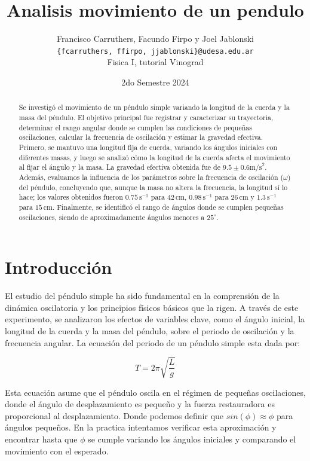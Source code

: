 \documentclass[12pt,a4]{article}
\title{Analisis movimiento de un pendulo}
\author{Francisco Carruthers, Facundo Firpo y Joel Jablonski\\ [2mm]
\small \texttt{\{fcarruthers, ffirpo, jjablonski\}@udesa.edu.ar}\\
\small Fisica I, tutorial Vinograd}
\date{2do Semestre 2024}
\begin{document}
\maketitle

\begin{abstract}
    Se investigó el movimiento de un péndulo simple variando la longitud de la cuerda y la masa del péndulo. El objetivo principal fue registrar y caracterizar su trayectoria, determinar el rango angular donde se cumplen las condiciones de pequeñas oscilaciones, calcular la frecuencia de oscilación y estimar la gravedad efectiva. Primero, se mantuvo una longitud fija de cuerda, variando los ángulos iniciales con diferentes masas, y luego se analizó cómo la longitud de la cuerda afecta el movimiento al fijar el ángulo y la masa. La gravedad efectiva obtenida fue de $9.5 \pm 0.6 \text{m/s}^2$. Además, evaluamos la influencia de los parámetros sobre la frecuencia de oscilación ($\omega$) del péndulo, concluyendo que, aunque la masa no altera la frecuencia, la longitud sí lo hace; los valores obtenidos fueron \(0.75 \, \text{s}^{-1}\) para \(42 \, \text{cm}\), \(0.98 \, \text{s}^{-1}\) para \(26 \, \text{cm}\) y \(1.3 \, \text{s}^{-1}\) para \(15 \, \text{cm}\). Finalmente, se identificó el rango de ángulos donde se cumplen pequeñas oscilaciones, siendo de aproximadamente ángulos menores a $25^\circ$.

\end{abstract}

\section{Introducción}

El estudio del péndulo simple ha sido fundamental en la comprensión de la dinámica oscilatoria y los principios físicos básicos que la rigen. A través de este experimento, se analizaron los efectos de variables clave, como el ángulo inicial, la longitud de la cuerda y la masa del péndulo, sobre el periodo de oscilación y la frecuencia angular. La ecuación del periodo de un péndulo simple esta dada por:

\begin{equation}
    T = 2 \pi \sqrt{\frac{L}{g}}
    \label{eq:periodo}
\end{equation}

Esta ecuación asume que el péndulo oscila en el régimen de pequeñas oscilaciones, donde el ángulo de desplazamiento es pequeño y la fuerza restauradora es proporcional al desplazamiento. Donde podemos definir que $sin(\phi) \approx \phi$ para ángulos pequeños. En la practica intentamos verificar esta aproximación y encontrar hasta que $\phi$ se cumple variando los ángulos iniciales y comparando el movimiento con el esperado.
\end{document}
